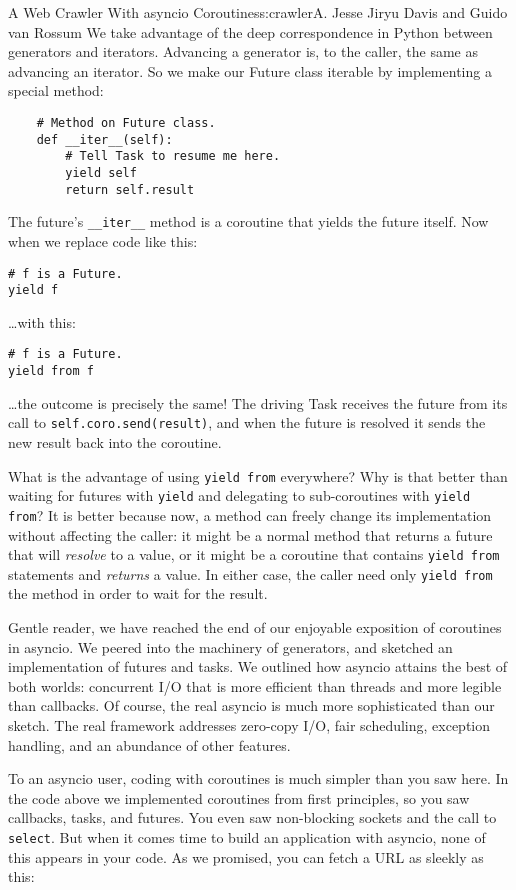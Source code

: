 \begin{aosachapter}{A Web Crawler With asyncio Coroutines}{s:crawler}{A. Jesse Jiryu Davis and Guido van Rossum}
We take advantage of the deep correspondence in Python between
generators and iterators. Advancing a generator is, to the caller, the
same as advancing an iterator. So we make our Future class iterable by
implementing a special method:

\begin{verbatim}
    # Method on Future class.
    def __iter__(self):
        # Tell Task to resume me here.
        yield self
        return self.result
\end{verbatim}

The future's \texttt{\_\_iter\_\_} method is a coroutine that yields the
future itself. Now when we replace code like this:

\begin{verbatim}
# f is a Future.
yield f
\end{verbatim}

\ldots{}with this:

\begin{verbatim}
# f is a Future.
yield from f
\end{verbatim}

\ldots{}the outcome is precisely the same! The driving Task receives the
future from its call to \texttt{self.coro.send(result)}, and when the
future is resolved it sends the new result back into the coroutine.

What is the advantage of using \texttt{yield from} everywhere? Why is
that better than waiting for futures with \texttt{yield} and delegating
to sub-coroutines with \texttt{yield from}? It is better because now, a
method can freely change its implementation without affecting the
caller: it might be a normal method that returns a future that will
\emph{resolve} to a value, or it might be a coroutine that contains
\texttt{yield from} statements and \emph{returns} a value. In either
case, the caller need only \texttt{yield from} the method in order to
wait for the result.

Gentle reader, we have reached the end of our enjoyable exposition of
coroutines in asyncio. We peered into the machinery of generators, and
sketched an implementation of futures and tasks. We outlined how asyncio
attains the best of both worlds: concurrent I/O that is more efficient
than threads and more legible than callbacks. Of course, the real
asyncio is much more sophisticated than our sketch. The real framework
addresses zero-copy I/O, fair scheduling, exception handling, and an
abundance of other features.

To an asyncio user, coding with coroutines is much simpler than you saw
here. In the code above we implemented coroutines from first principles,
so you saw callbacks, tasks, and futures. You even saw non-blocking
sockets and the call to \texttt{select}. But when it comes time to build
an application with asyncio, none of this appears in your code. As we
promised, you can fetch a URL as sleekly as this:


\end{aosachapter}
